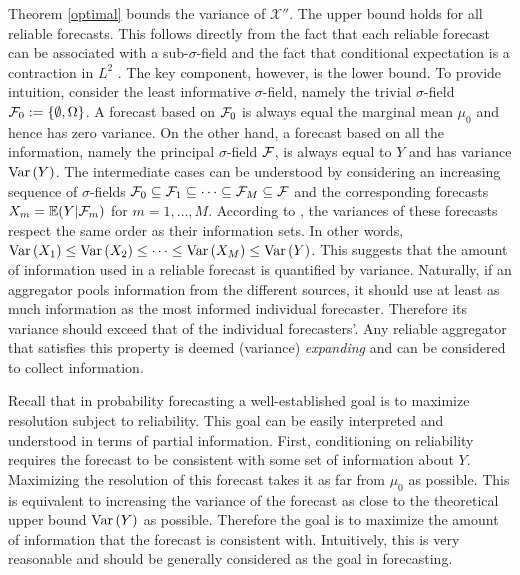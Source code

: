 \documentclass[11pt]{article}
\newcommand{\E}{\mathbb{E}}
\theoremstyle{definition}
\theoremstyle{definition}
\def\F{{\cal F}}
\def\E{{\mathbb E}}
\def\Var{{\rm Var}\,}
\begin{document}
Theorem \ref{optimal} bounds the variance of $\mathcal{X}''$. The upper bound holds for all reliable forecasts. This follows directly from the fact that each reliable forecast can be associated with a sub-$\sigma$-field and the fact that conditional expectation is a contraction in $L^2$ \citep[Theorem 5.1.4.]{durrett2010probability}. The key component, however, is the lower bound.
To provide intuition, consider the least informative $\sigma$-field, namely the trivial $\sigma$-field $\F_0 := \{\emptyset, \Omega\}$. A forecast based on $\F_0$ is always equal the marginal mean $\mu_0$ and hence has zero variance. On the other hand, a forecast based on all the information, namely the principal $\sigma$-field $\F$, is always equal to $Y$ and has variance $\Var(Y)$. 
The intermediate cases can be understood by considering an increasing sequence of $\sigma$-fields $\F_0 \subseteq \F_1 \subseteq \dots \subseteq \F_M \subseteq \F$ and the corresponding forecasts $X_m = \E(Y|\F_m)$ for $m = 1, \dots, M$. According to \citet[Proposition 2.1]{satopaamodeling2}, the variances of these forecasts respect the same order as their information sets. In other words, $\Var(X_1) \leq \Var(X_2) \leq \dots \leq \Var(X_M) \leq \Var(Y)$. This suggests that the amount of information used in a reliable forecast is quantified by variance. Naturally, if an aggregator pools information from the different sources, it should use at least as much information as the most informed individual forecaster.  Therefore its variance should exceed that of the individual forecasters'. Any reliable aggregator that satisfies this property is deemed (variance) \textit{expanding} and can be considered to collect information. 
%


Recall that in probability forecasting a well-established goal is to maximize resolution subject to reliability. This goal can be easily interpreted and understood in terms of partial information. First, conditioning on reliability requires the forecast to be consistent with some set of information about $Y$. Maximizing the resolution of this forecast takes it as far from $\mu_0$ as possible. This is equivalent to increasing the variance of the forecast as close to the theoretical upper bound $\Var(Y)$ as possible. Therefore the goal is to maximize the amount of information that the forecast is consistent with. Intuitively, this is very reasonable and should be generally considered as the goal in forecasting.
\end{document}
